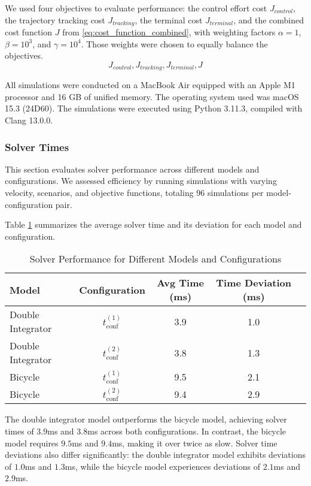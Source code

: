 We used four objectives to evaluate performance: the control effort cost $J_{control}$, the trajectory tracking cost $J_{tracking}$, the terminal
cost $J_{terminal}$, and the combined cost function $J$ from \eqref{eq:cost_function_combined}, with weighting factors $\alpha = 1$, $\beta = 10^3$,
and $\gamma = 10^4$.
Those weights were chosen to equally balance the objectives.
\[
	J_{control}, J_{tracking}, J_{terminal}, J
\]

All simulations were conducted on a MacBook Air equipped with an Apple M1 processor and 16 GB of unified memory.
The operating system used was macOS 15.3 (24D60).
The simulations were executed using Python 3.11.3, compiled with Clang 13.0.0.

\subsubsection{Solver Times}

This section evaluates solver performance across different models and configurations.
We assessed efficiency by running simulations with varying velocity, scenarios, and objective functions, totaling $96$ simulations per
model-configuration pair.

Table \ref{tab:solver_performance} summarizes the average solver time and its deviation for each model and configuration.

\begin{table}[h]
	\centering
	\caption{Solver Performance for Different Models and Configurations}
	\label{tab:solver_performance}
	\begin{tabular}{lcccc}
		\toprule
		\textbf{Model}    & \textbf{Configuration}  & \textbf{Avg Time (ms)} & \textbf{Time Deviation (ms)} \\
		\midrule
		Double Integrator & $t_{\text{conf}}^{(1)}$ & 3.9                    & 1.0                          \\
		Double Integrator & $t_{\text{conf}}^{(2)}$ & 3.8                    & 1.3                          \\
		Bicycle           & $t_{\text{conf}}^{(1)}$ & 9.5                    & 2.1                          \\
		Bicycle           & $t_{\text{conf}}^{(2)}$ & 9.4                    & 2.9                          \\
		\bottomrule
	\end{tabular}
\end{table}

The double integrator model outperforms the bicycle model, achieving solver times of $3.9$ms and $3.8$ms across both configurations.
In contrast, the bicycle model requires $9.5$ms and $9.4$ms, making it over twice as slow.
Solver time deviations also differ significantly: the double integrator model exhibits deviations of $1.0$ms and $1.3$ms, while the bicycle model
experiences deviations of $2.1$ms and $2.9$ms.

